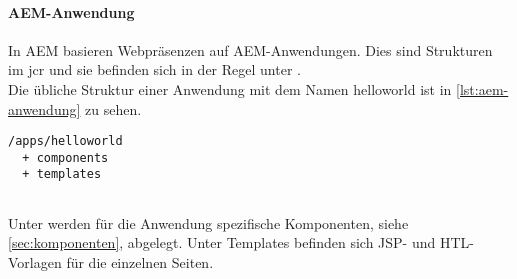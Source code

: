 \paragraph{AEM-Anwendung}
In AEM basieren Webpräsenzen auf AEM-Anwendungen. Dies sind Strukturen im \ac{jcr} und sie befinden sich in der Regel unter  \cite[S. 6.4]{Incorporated2015}. \\
Die übliche Struktur einer Anwendung mit dem Namen helloworld ist in \autoref{lst:aem-anwendung} zu sehen.

\begin{lstlisting}[style=jcr,caption=Exemplarische Darstellung einer AEM Anwendung, label=lst:aem-anwendung]
/apps/helloworld
  + components
  + templates
  
\end{lstlisting}

Unter  werden für die Anwendung spezifische Komponenten, siehe \autoref{sec:komponenten}, abgelegt. Unter Templates befinden sich JSP- und HTL- Vorlagen für die einzelnen Seiten.
